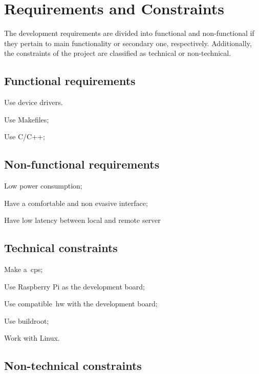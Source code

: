\section{Requirements and Constraints}
\label{sec:req-const}

The development requirements are divided into functional and non-functional if they pertain to main functionality or secondary one, respectively. Additionally, the constraints of the project are classified as technical or non-technical.

\subsection{Functional requirements}
\label{sec:funct-requ}

\begin{item-c}
\item Use device drivers.
\item Use Makefiles;
\item Use C/C++;
\end{item-c}
\subsection{Non-functional requirements}
\label{sec:non-funct-requ}

\begin{item-c}
\item Low power consumption;
\item Have a comfortable and non evasive interface;
\item Have low latency between local and remote server
\end{item-c}
\subsection{Technical constraints}
\label{sec:techn-constr}

\begin{item-c}
\item Make a~\gls{cps};
\item Use Raspberry Pi as the development board;
\item Use compatible~\gls{hw} with the development board;
\item Use buildroot;
\item Work with Linux.
\end{item-c}
\subsection{Non-technical constraints}
\label{sec:non-techn-constr}


